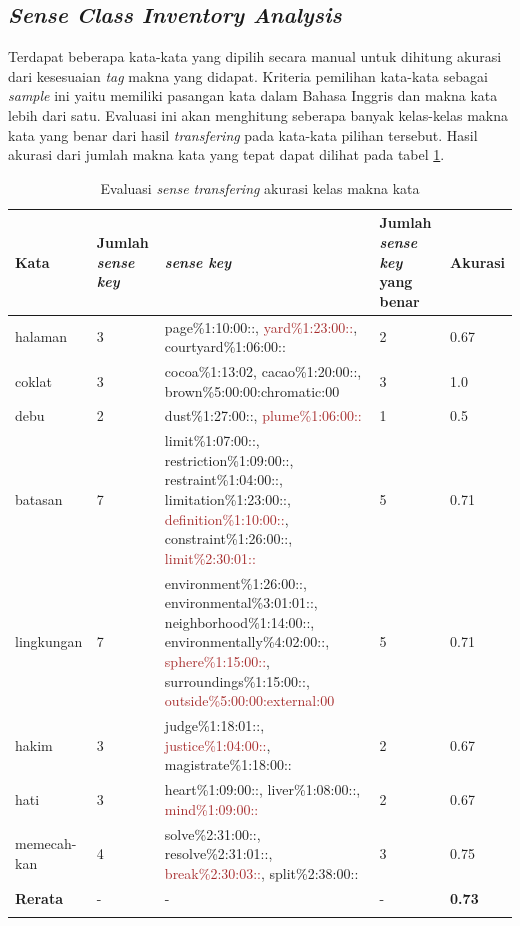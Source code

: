 \subsection{\textit{Sense Class Inventory Analysis}}

Terdapat beberapa kata-kata yang dipilih secara manual untuk dihitung akurasi dari kesesuaian \textit{tag} makna yang didapat. Kriteria pemilihan kata-kata sebagai \textit{sample} ini yaitu memiliki pasangan kata  dalam Bahasa Inggris dan makna kata lebih dari satu. Evaluasi ini akan menghitung seberapa banyak kelas-kelas makna kata yang benar dari hasil \textit{transfering} pada kata-kata pilihan tersebut. Hasil akurasi dari jumlah makna kata yang tepat dapat dilihat pada tabel \ref{table:akuras-kelas-makna-kata}.

\begin{longtable}{|p{1.8cm}|p{1.2cm}|p{5cm}|p{1.2cm}|p{1.5cm}|} 
	\hline
	\textbf{Kata} & \textbf{Jumlah \textit{sense key}} & \textbf{\textit{sense key}}  & \textbf{Jumlah \textit{sense key} yang benar} & \textbf{Akurasi} \\ \hline
	halaman & 3 &  page\%1:10:00::, \textcolor{brown}{yard\%1:23:00::}, courtyard\%1:06:00:: & 2 & 0.67 \\ \hline
	coklat & 3 & cocoa\%1:13:02, cacao\%1:20:00::, brown\%5:00:00:chromatic:00 & 3 & 1.0 \\ \hline
	debu & 2 & dust\%1:27:00::, \textcolor{brown}{plume\%1:06:00::} & 1 & 0.5 \\ \hline
	batasan & 7 & limit\%1:07:00::, restriction\%1:09:00::, restraint\%1:04:00::, limitation\%1:23:00::, \textcolor{brown}{definition\%1:10:00::}, constraint\%1:26:00::, \textcolor{brown}{limit\%2:30:01::} & 5 & 0.71 \\ \hline
	lingkungan & 7 & environment\%1:26:00::, environmental\%3:01:01::, neighborhood\%1:14:00::, environmentally\%4:02:00::, \textcolor{brown}{sphere\%1:15:00::}, surroundings\%1:15:00::, \textcolor{brown}{outside\%5:00:00:external:00} & 5 & 0.71 \\ \hline
	hakim & 3 & judge\%1:18:01::, \textcolor{brown}{justice\%1:04:00::}, magistrate\%1:18:00:: & 2 & 0.67 \\ \hline
	hati & 3 & heart\%1:09:00::, liver\%1:08:00::, \textcolor{brown}{mind\%1:09:00::} & 2 & 0.67 \\ \hline
	memecah-kan & 4 & solve\%2:31:00::, resolve\%2:31:01::, \textcolor{brown}{break\%2:30:03::}, split\%2:38:00:: & 3 & 0.75 \\ \hline
	\hline
	\textbf{Rerata} & - & - & - & \textbf{0.73} \\ \hline
	\caption{Evaluasi \textit{sense transfering} akurasi kelas makna kata}
	\label{table:akuras-kelas-makna-kata}
\end{longtable}
 
